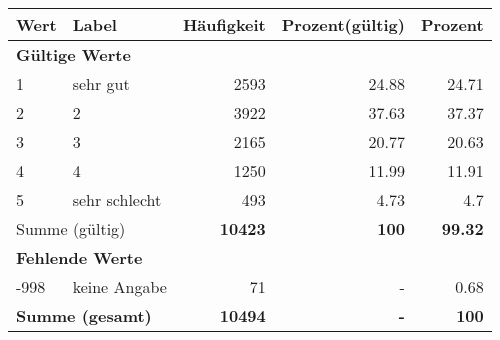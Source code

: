      \begin{longtable}{lXrrr}
     \toprule
     \textbf{Wert} & \textbf{Label} & \textbf{Häufigkeit} & \textbf{Prozent(gültig)} & \textbf{Prozent} \\
     \endhead
     \midrule
     \multicolumn{5}{l}{\textbf{Gültige Werte}}\\

     1 &
     \multicolumn{1}{X}{ sehr gut   } &


       \num{2593} &
       \num[round-mode=places,round-precision=2]{24,88} &
         \num[round-mode=places,round-precision=2]{24,71} \\

     2 &
     \multicolumn{1}{X}{ 2   } &


       \num{3922} &
       \num[round-mode=places,round-precision=2]{37,63} &
         \num[round-mode=places,round-precision=2]{37,37} \\

     3 &
     \multicolumn{1}{X}{ 3   } &


       \num{2165} &
       \num[round-mode=places,round-precision=2]{20,77} &
         \num[round-mode=places,round-precision=2]{20,63} \\

     4 &
     \multicolumn{1}{X}{ 4   } &


       \num{1250} &
       \num[round-mode=places,round-precision=2]{11,99} &
         \num[round-mode=places,round-precision=2]{11,91} \\

     5 &
     \multicolumn{1}{X}{ sehr schlecht   } &


       \num{493} &
       \num[round-mode=places,round-precision=2]{4,73} &
         \num[round-mode=places,round-precision=2]{4,7} \\
     \midrule
     \multicolumn{2}{l}{Summe (gültig)} &
       \textbf{\num{10423}} &
     \textbf{100} &
       \textbf{\num[round-mode=places,round-precision=2]{99,32}} \\
     \multicolumn{5}{l}{\textbf{Fehlende Werte}}\\
       -998 &
       keine Angabe &
         \num{71} &
        - &
         \num[round-mode=places,round-precision=2]{0,68} \\
     \midrule
     \multicolumn{2}{l}{\textbf{Summe (gesamt)}} &
          \textbf{\num{10494}} &
        \textbf{-} &
        \textbf{100} \\
     \bottomrule
     \end{longtable}
     
